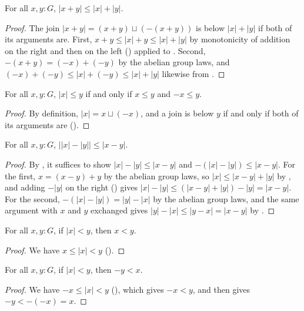 \begin{lemma}[\agda{▵≤}]
  \label{triangleLe}
  For all $x, y : G$, $\lvert x + y \rvert \le \lvert x \rvert + \lvert y \rvert$.
\end{lemma}
\begin{proof}
  The join $\lvert x + y \rvert = (x + y) \sqcup (-(x + y))$ is below $\lvert x \rvert + \lvert y \rvert$ if both of its arguments are. First, $x + y \le \lvert x \rvert + y \le \lvert x \rvert + \lvert y \rvert$ by monotonicity of addition on the right and then on the left () applied to . Second, $-(x + y) = (-x) + (-y)$ by the abelian group laws, and $(-x) + (-y) \le \lvert x \rvert + (-y) \le \lvert x \rvert + \lvert y \rvert$ likewise from .
\end{proof}

\begin{lemma}
  \label{absLeIff}
  For all $x, y : G$, $\lvert x \rvert \le y$ if and only if $x \le y$ and $-x \le y$.
\end{lemma}
\begin{proof}
  By definition, $\lvert x \rvert = x \sqcup (-x)$, and a join is below $y$ if and only if both of its arguments are ().
\end{proof}

\begin{lemma}
  \label{absDeltaAbsLe}
  For all $x, y : G$, $\lvert \lvert x \rvert - \lvert y \rvert \rvert \le \lvert x - y \rvert$.
\end{lemma}
\begin{proof}
  By , it suffices to show $\lvert x \rvert - \lvert y \rvert \le \lvert x - y \rvert$ and $-(\lvert x \rvert - \lvert y \rvert) \le \lvert x - y \rvert$. For the first, $x = (x - y) + y$ by the abelian group laws, so $\lvert x \rvert \le \lvert x - y \rvert + \lvert y \rvert$ by , and adding $-\lvert y \rvert$ on the right () gives $\lvert x \rvert - \lvert y \rvert \le (\lvert x - y \rvert + \lvert y \rvert) - \lvert y \rvert = \lvert x - y \rvert$. For the second, $-(\lvert x \rvert - \lvert y \rvert) = \lvert y \rvert - \lvert x \rvert$ by the abelian group laws, and the same argument with $x$ and $y$ exchanged gives $\lvert y \rvert - \lvert x \rvert \le \lvert y - x \rvert = \lvert x - y \rvert$ by .
\end{proof}

\begin{corollary}
  \label{absLtLt}
  For all $x, y : G$, if $\lvert x \rvert < y$, then $x < y$.
\end{corollary}
\begin{proof}
  We have $x \le \lvert x \rvert < y$ ().
\end{proof}

\begin{corollary}
  \label{absLtNegLt}
  For all $x, y : G$, if $\lvert x \rvert < y$, then $-y < x$.
\end{corollary}
\begin{proof}
  We have $-x \le \lvert x \rvert < y$ (), which gives $-x < y$, and then  gives $-y < -(-x) = x$.
\end{proof}
